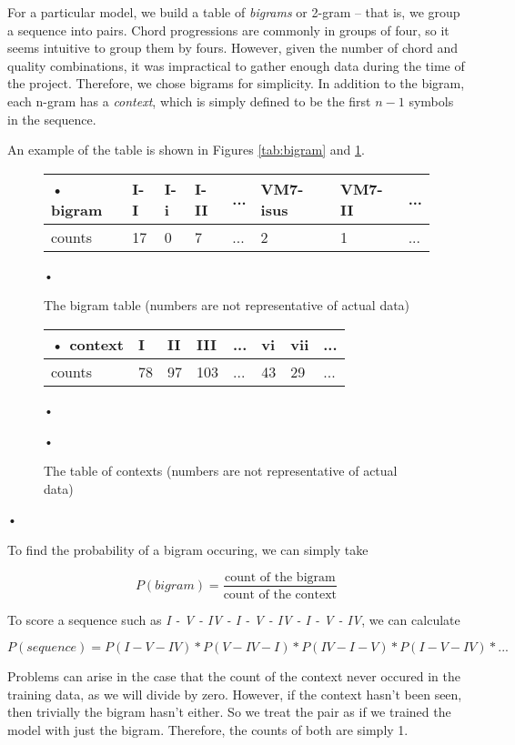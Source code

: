 \documentclass{article}
\begin{document}
For a particular model, we build a table of \emph{bigrams} or 2-gram -- that is, we group
a sequence into pairs. Chord progressions are commonly in groups of four, so it 
seems intuitive to group them by fours. However,
given the number of chord and quality combinations, it was impractical to gather
enough data during the time of the project. Therefore, we chose bigrams for
simplicity. In addition to the bigram, each n-gram has a \emph{context}, which
is simply defined to be the first $n-1$ symbols in the sequence.

An example of the table is shown in Figures \ref{tab:bigram} and \ref{tab:context}.

	\begin{figure}[h]

	\begin{center}
		\begin{tabular}{l | l | l | l | l | l | l | l}
•		bigram &	I-I 	& I-i	& I-II	& ...	& VM7-isus	& VM7-II	& ... \\ \hline
		counts & 17	& 0	& 7	& ...	& 2			& 1		& ... \\
		\end{tabular}•
	\end{center}
	\caption{The bigram table (numbers are not representative of actual data)}
	\label{tab:bigram}

	
	\begin{center}
		\begin{tabular}{l|l|l|l|l|l|l|l}
•		context	&	I 	&	II	&	III	&	...	&	vi	&	vii	&	...	\\[0.3em] \hline
		counts	&	78	&	97	&	103	&	...	&	43	&	29	&	...	\\
		\end{tabular}•
	\end{center}•
	\caption{The table of contexts (numbers are not representative of actual data)}
	\label{tab:context}
	\end{figure}•

To find the probability of a bigram occuring, we can simply take

	\[
	P(bigram) = \frac{\text{count of the bigram}}{\text{count of the context}}
	\]

To score a sequence such as \emph{I - V - IV - I - V - IV - I - V - IV}, we can calculate

	\[
	P(sequence) = P(I - V - IV) * P(V - IV - I) * P(IV - I - V) * P(I - V - IV) * ...
	\]

Problems can arise in the case that the count of the context never occured
in the training data,
as we will divide by zero. However, if the context hasn't been seen, then
trivially the bigram hasn't either. So we treat the pair as if we trained the
model with just the bigram. Therefore, the counts of both are simply 1.
\end{document}
